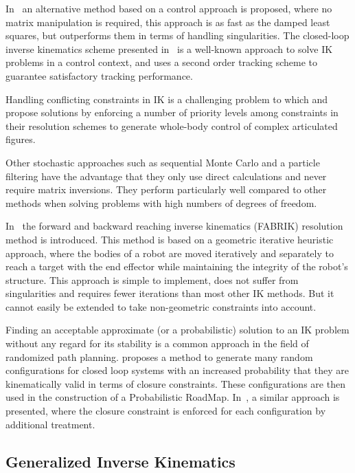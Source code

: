 In~\cite{pechev2008inverse} an alternative method based on a control approach is proposed, where no matrix manipulation is required, this approach is as fast as the damped least squares, but outperforms them in terms of handling singularities.
The closed-loop inverse kinematics scheme presented in~\cite{siciliano1990closed} is a well-known approach to solve IK problems in a control context, and uses a second order tracking scheme to guarantee satisfactory tracking performance.

Handling conflicting constraints in IK is a challenging problem to which \cite{baerlocher2004inverse} and \cite{sentis2005synthesis} propose solutions by enforcing a number of priority levels among constraints in their resolution schemes to generate whole-body control of complex articulated figures.

Other stochastic approaches such as sequential Monte Carlo \cite{courty2008inverse} and a particle filtering \cite{hecker2008real} have the advantage that they only use direct calculations and never require matrix inversions.
They perform particularly well compared to other methods when solving problems with high numbers of degrees of freedom.

In~\cite{AristidouFABRIK, Aristidou:2016_ExtFABRIK} the forward and backward reaching inverse kinematics (FABRIK) resolution method is introduced.
This method is based on a geometric iterative heuristic approach, where the bodies of a robot are moved iteratively and separately to reach a target with the end effector while maintaining the integrity of the robot's structure.
This approach is simple to implement, does not suffer from singularities and requires fewer iterations than most other IK methods.
But it cannot easily be extended to take non-geometric constraints into account.

Finding an acceptable approximate (or a probabilistic) solution to an IK problem without any regard for its stability is a common approach in the field of randomized path planning.
\cite{cortes2002random} proposes a method to generate many random configurations for closed loop systems with an increased probability that they are kinematically valid in terms of closure constraints.
These configurations are then used in the construction of a Probabilistic RoadMap.
In~\cite{lavalle1999probabilistic}, a similar approach is presented, where the closure constraint is enforced for each configuration by additional treatment.

\subsection{Generalized Inverse Kinematics}
\label{sub:generalized_inverse_kinematics}

